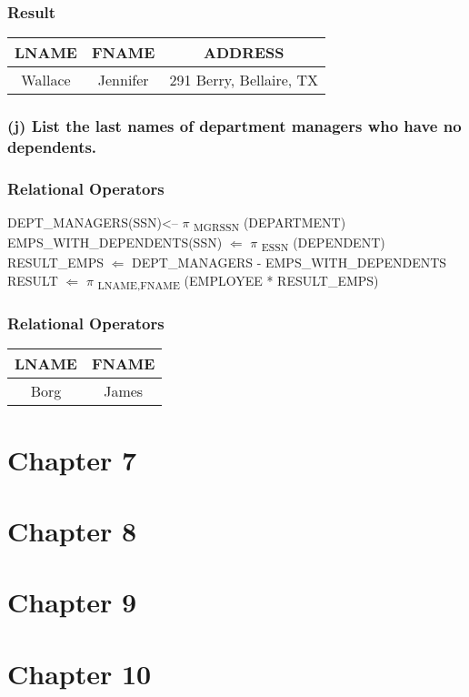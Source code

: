 \documentclass[11pt, oneside]{article}   	%
\begin{document}
\subsubsection*{Result}
\begin{center}
\begin{tabular}{ c | c | c}
  LNAME & FNAME  & ADDRESS \\ \hline
  Wallace & Jennifer & 291 Berry, Bellaire, TX \\
\end{tabular}
\end{center}

\subsubsection*{(j) List the last names of department managers who have no dependents.}
\subsubsection*{Relational Operators}
DEPT\_MANAGERS(SSN)<-- $\pi$ \textsubscript{MGRSSN} (DEPARTMENT) \\
EMPS\_WITH\_DEPENDENTS(SSN) $\Leftarrow$ $\pi$ \textsubscript{ESSN} (DEPENDENT) \\
RESULT\_EMPS $\Leftarrow$ DEPT\_MANAGERS - EMPS\_WITH\_DEPENDENTS \\
RESULT $\Leftarrow$ $\pi$ \textsubscript{LNAME,FNAME} (EMPLOYEE * RESULT\_EMPS)

\subsubsection*{Relational Operators}
\begin{center}
\begin{tabular}{ c | c }
  LNAME & FNAME \\ \hline
  Borg & James \\
\end{tabular}
\end{center}

\section*{Chapter 7}

\section*{Chapter 8}

\section*{Chapter 9}

\section*{Chapter 10}
\end{document}
